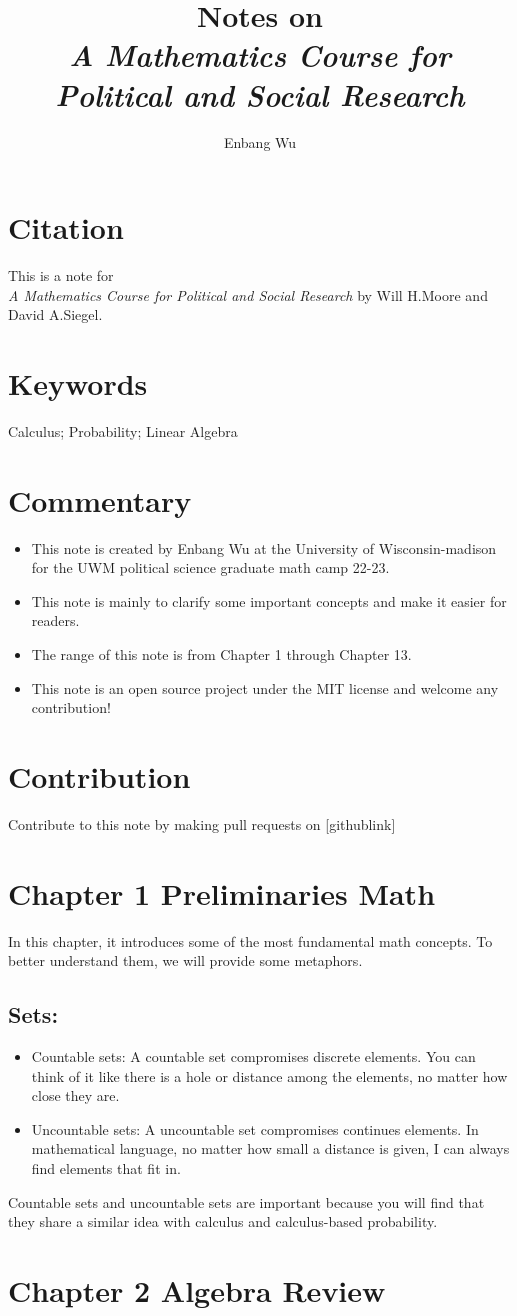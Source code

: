 \documentclass{article}
\title{Notes on \\ \textit{A Mathematics Course for Political and Social Research}}
\author{Enbang Wu}
\begin{document}
\maketitle

\section{Citation}
This is a note for \\ \textit{A Mathematics Course for Political and Social Research} by Will H.Moore and David A.Siegel.

\section{Keywords}
Calculus; Probability; Linear Algebra


\section{Commentary}
\begin{itemize}
    \item This note is created by Enbang Wu at the University of Wisconsin-madison for the UWM political science graduate math camp 22-23.
    \item This note is mainly to clarify some important concepts and make it easier for readers.
    \item The range of this note is from Chapter 1 through Chapter 13.
    \item This note is an open source project under the MIT license and welcome any contribution!
\end{itemize}

\section{Contribution}
Contribute to this note by making pull requests on [githublink]

\newpage
\tableofcontents
\newpage

\section{Chapter 1 Preliminaries Math}
In this chapter, it introduces some of the most fundamental math concepts. To better understand them, we will provide some metaphors.
\subsection{Sets:}
\begin{itemize}
    \item Countable sets: A countable set compromises discrete elements. You can think of it like there is a hole or distance among the elements, no matter how close they are. 
    \item Uncountable sets: A uncountable set compromises continues elements. In mathematical language, no matter how small a distance is given, I can always find elements that fit in.
\end{itemize}
Countable sets and uncountable sets are important because you will find that they share a similar idea with calculus and calculus-based probability. 

\section{Chapter 2 Algebra Review}
\end{document}
